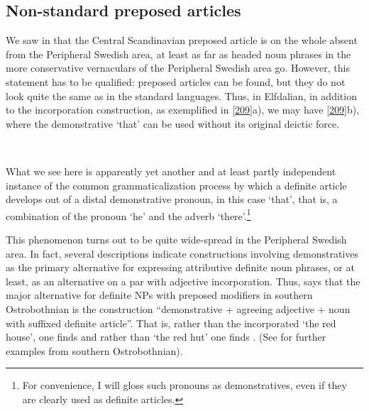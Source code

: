 \subsection{Non-standard preposed articles }
\label{bkm:Ref264372580}\label{bkm:Ref264372864}\label{bkm:Ref264372909}

We saw in  that the Central Scandinavian preposed article is on the whole absent from the Peripheral Swedish area, at least as far as headed noun phrases in the more conservative vernaculars of the Peripheral Swedish area go. However, this statement has to be qualified: preposed articles can be found, but they do not look quite the same as in the standard languages. Thus, in Elfdalian, in addition to the incorporation construction, as exemplified in \ref{209}a), we may have \ref{209}b), where the demonstrative  ‘that’ can be used without its original deictic force.

\ea\label{}
\\

\z 
\z 

What we see here is apparently yet another and at least partly independent instance of the common grammaticalization process by which a definite article develops out of a distal demonstrative pronoun, in this case  ‘that’, that is, a combination of the pronoun  ‘he’ and the adverb  ‘there’.\footnote{ For convenience, I will gloss such pronouns as demonstratives, even if they are clearly used as definite articles.} 

This phenomenon turns out to be quite wide-spread in the Peripheral Swedish area. In fact, several descriptions indicate constructions involving demonstratives as the primary alternative for expressing attributive definite noun phrases, or at least, as an alternative on a par with adjective incorporation. Thus, \citet{Ivars2005} says that the major alternative for definite NPs with preposed modifiers in southern Ostrobothnian is the construction “demonstrative  + agreeing adjective + noun with suffixed definite article”. That is, rather than the incorporated  ‘the red house’, one finds  and rather than  ‘the red hut’ one finds . (See \citet[158]{Vangsnes2003} for further examples from southern Ostrobothnian). 

